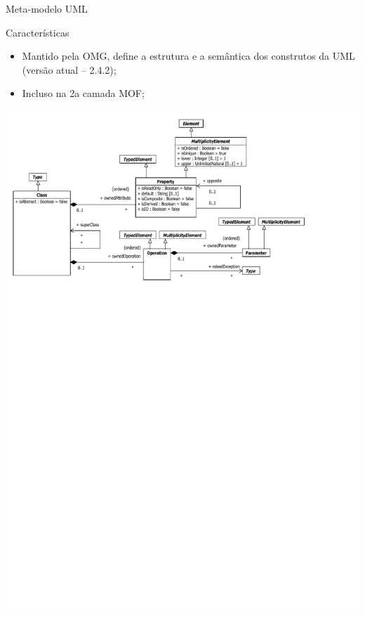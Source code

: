 \documentclass[12pt,t]{beamer}
\begin{document}
	 \begin{frame}{Meta-modelo UML}
	 	\begin{block}{Características}
	 		\begin{itemize}
	 			\item Mantido pela OMG, define a estrutura e a semântica dos construtos da UML (versão atual -- 2.4.2);
	 			\pause
	 			\item Incluso na 2a camada MOF;
	 		\end{itemize}
	 	\end{block}
	 	\begin{block}{ }
 	 		\centerline{\includegraphics[trim=10 430 70 15, clip=true, height=0.80\textheight]{uml.pdf}}
	 	\end{block}
	\end{frame}	 	
\end{document}
